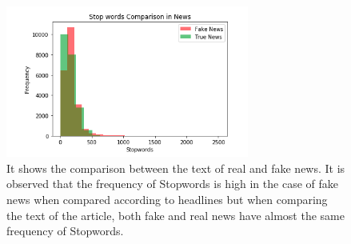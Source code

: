 \documentclass[runningheads]{llncs}
\begin{document}
\begin{enumerate}
\begin{figure}
\end{figure}
\begin{figure}
\centering
\includegraphics[width=8cm]{stopText.png}
\caption{It shows the comparison between the text of real and fake news. It is observed that the frequency of Stopwords is high in the case of fake news when compared according to headlines but when comparing the text of the article, both fake and real news have almost the same frequency of Stopwords.} \label{fig4}
\end{figure}
\end{enumerate}
\newpage
\end{document}
